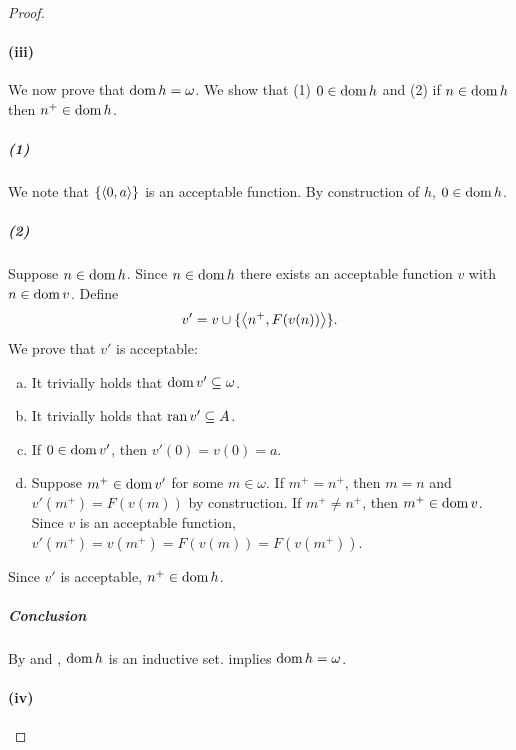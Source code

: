 \documentclass{report}
\begin{document}
\begin{proof}
    \paragraph{(iii)}%

      We now prove that $\mathop{\text{dom}}{h} = \omega$.
      We show that (1) $0 \in \mathop{\text{dom}}{h}$ and (2) if $n \in \mathop{\text{dom}}{h}$ then
        $n^+ \in \mathop{\text{dom}}{h}$.

      \subparagraph{(1)}%

        We note that $\{\left< 0, a \right>\}$ is an acceptable function.
        By construction of $h$, $0 \in \mathop{\text{dom}}{h}$.

      \subparagraph{(2)}%

        Suppose $n \in \mathop{\text{dom}}{h}$.
        Since $n \in \mathop{\text{dom}}{h}$ there exists an acceptable function $v$ with
          $n \in \mathop{\text{dom}}{v}$.
        Define $$v' = v \cup \{\left< n^+, F(v(n)) \right>\}.$$
        We prove that $v'$ is acceptable:

        \begin{enumerate}[(a)]
          \item It trivially holds that $\mathop{\text{dom}}{v'} \subseteq \omega$.
          \item It trivially holds that $\mathop{\text{ran}}{v'} \subseteq A$.
          \item If $0 \in \mathop{\text{dom}}{v'}$, then $v'(0) = v(0) = a$.
          \item
            Suppose $m^+ \in \mathop{\text{dom}}{v'}$ for some $m \in \omega$.
            If $m^+ = n^+$, then $m = n$ and $v'(m^+) = F(v(m))$ by
              construction.
            If $m^+ \neq n^+$, then $m^+ \in \mathop{\text{dom}}{v}$.
            Since $v$ is an acceptable function,
              $v'(m^+) = v(m^+) = F(v(m)) = F(v(m^+))$.
        \end{enumerate}
        Since $v'$ is acceptable, $n^+ \in \mathop{\text{dom}}{h}$.

      \subparagraph{Conclusion}%

        By  and
          ,
          $\mathop{\text{dom}}{h}$ is an inductive set.
         implies $\mathop{\text{dom}}{h} = \omega$.

    \paragraph{(iv)}%


\end{proof}
\end{document}
